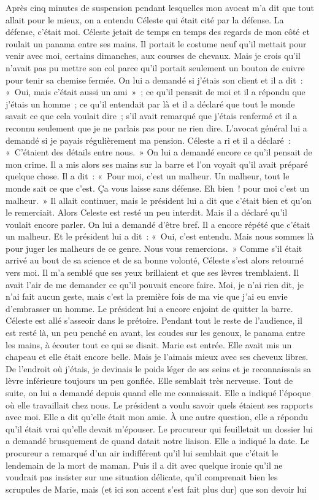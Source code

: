 \documentclass[french,twoside]{book} %
\begin{document}
Après cinq minutes de suspension pendant lesquelles mon avocat m’a dit que tout allait pour le mieux, on a entendu Céleste qui était cité par la défense. La défense, c’était moi. Céleste jetait de temps en temps des regards de mon côté et roulait un panama entre ses mains. Il portait le costume neuf qu’il mettait pour venir avec moi, certains dimanches, aux courses de chevaux. Mais je crois qu’il n’avait pas pu mettre son col parce qu’il portait seulement un bouton de cuivre pour tenir sa chemise fermée. On lui a demandé si j’étais son client et il a dit : « Oui, mais c’était aussi un ami » ; ce qu’il pensait de moi et il a répondu que j’étais un homme ; ce qu’il entendait par là et il a déclaré que tout le monde savait ce que cela voulait dire ; s’il avait remarqué que j’étais renfermé et il a reconnu seulement que je ne parlais pas pour ne rien dire. L'avocat général lui a demandé si je payais régulièrement ma pension. Céleste a ri et il a déclaré : « C'étaient des détails entre nous. » On lui a demandé encore ce qu’il pensait de mon crime. Il a mis alors ses mains sur la barre et l’on voyait qu’il avait préparé quelque chose. Il a dit : « Pour moi, c’est un malheur. Un malheur, tout le monde sait ce que c’est. Ça vous laisse sans défense. Eh bien ! pour moi c’est un malheur. » Il allait continuer, mais le président lui a dit que c’était bien et qu’on le remerciait. Alors Celeste est resté un peu interdit. Mais il a déclaré qu’il voulait encore parler. On lui a demandé d’être bref. Il a encore répété que c’était un malheur. Et le président lui a dit : « Oui, c’est entendu. Mais nous sommes là pour juger les malheurs de ce genre. Nous vous remercions. » Comme s’il était arrivé au bout de sa science et de sa bonne volonté, Céleste s’est alors retourné vers moi. Il m’a semblé que ses yeux brillaient et que ses lèvres tremblaient. Il avait l’air de me demander ce qu’il pouvait encore faire. Moi, je n’ai rien dit, je n’ai fait aucun geste, mais c’est la première fois de ma vie que j’ai eu envie d’embrasser un homme. Le président lui a encore enjoint de quitter la barre. Céleste est allé s’asseoir dans le prétoire. Pendant tout le reste de l’audience, il est resté là, un peu penché en avant, les coudes sur les genoux, le panama entre les mains, à écouter tout ce qui se disait. Marie est entrée. Elle avait mis un chapeau et elle était encore belle. Mais je l’aimais mieux avec ses cheveux libres. De l’endroit où j’étais, je devinais le poids léger de ses seins et je reconnaissais sa lèvre inférieure toujours un peu gonflée. Elle semblait très nerveuse. Tout de suite, on lui a demandé depuis quand elle me connaissait. Elle a indiqué l’époque où elle travaillait chez nous. Le président a voulu savoir quels étaient ses rapports avec moi. Elle a dit qu’elle était mon amie. À une autre question, elle a répondu qu’il était vrai qu’elle devait m’épouser. Le procureur qui feuilletait un dossier lui a demandé brusquement de quand datait notre liaison. Elle a indiqué la date. Le procureur a remarqué d’un air indifférent qu’il lui semblait que c’était le lendemain de la mort de maman. Puis il a dit avec quelque ironie qu’il ne voudrait pas insister sur une situation délicate, qu’il comprenait bien les scrupules de Marie, mais (et ici son accent s’est fait plus dur) que son devoir lui 
\end{document}
